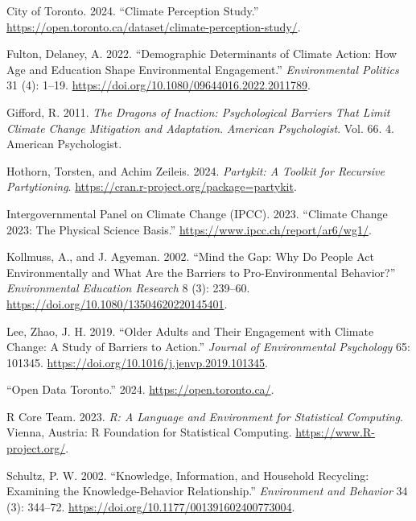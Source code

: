 \documentclass[
  letterpaper,
  DIV=11,
  numbers=noendperiod]{scrartcl}
\newlength{\cslhangindent}
\newenvironment{CSLReferences}[2] %
 {\begin{list}{}{%
  \setlength{\itemindent}{0pt}
  \setlength{\leftmargin}{0pt}
  \setlength{\parsep}{0pt}
  \ifodd #1
   \setlength{\leftmargin}{\cslhangindent}
   \setlength{\itemindent}{-1\cslhangindent}
  \fi
  \setlength{\itemsep}{#2\baselineskip}}}
 {\end{list}}
\begin{document}
\label{refs}
\begin{CSLReferences}{1}{0}
City of Toronto. 2024. {``Climate Perception Study.''}
\url{https://open.toronto.ca/dataset/climate-perception-study/}.

Fulton, Delaney, A. 2022. {``Demographic Determinants of Climate Action:
How Age and Education Shape Environmental Engagement.''}
\emph{Environmental Politics} 31 (4): 1--19.
\url{https://doi.org/10.1080/09644016.2022.2011789}.

Gifford, R. 2011. \emph{The Dragons of Inaction: Psychological Barriers
That Limit Climate Change Mitigation and Adaptation}. \emph{American
Psychologist}. Vol. 66. 4. American Psychologist.

Hothorn, Torsten, and Achim Zeileis. 2024. \emph{Partykit: A Toolkit for
Recursive Partytioning}.
\url{https://cran.r-project.org/package=partykit}.

Intergovernmental Panel on Climate Change (IPCC). 2023. {``Climate
Change 2023: The Physical Science Basis.''}
\url{https://www.ipcc.ch/report/ar6/wg1/}.

Kollmuss, A., and J. Agyeman. 2002. {``Mind the Gap: Why Do People Act
Environmentally and What Are the Barriers to Pro-Environmental
Behavior?''} \emph{Environmental Education Research} 8 (3): 239--60.
\url{https://doi.org/10.1080/13504620220145401}.

Lee, Zhao, J. H. 2019. {``Older Adults and Their Engagement with Climate
Change: A Study of Barriers to Action.''} \emph{Journal of Environmental
Psychology} 65: 101345.
\url{https://doi.org/10.1016/j.jenvp.2019.101345}.

{``Open Data Toronto.''} 2024. \url{https://open.toronto.ca/}.

R Core Team. 2023. \emph{{R: A Language and Environment for Statistical
Computing}}. Vienna, Austria: R Foundation for Statistical Computing.
\url{https://www.R-project.org/}.

Schultz, P. W. 2002. {``Knowledge, Information, and Household Recycling:
Examining the Knowledge-Behavior Relationship.''} \emph{Environment and
Behavior} 34 (3): 344--72.
\url{https://doi.org/10.1177/001391602400773004}.


\end{CSLReferences}
\end{document}
